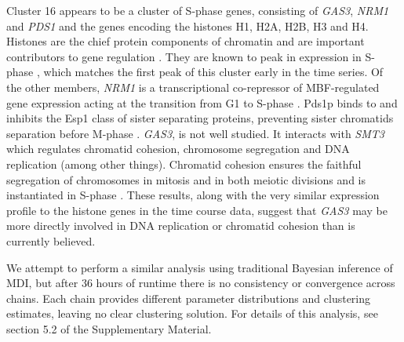 \documentclass[12pt]{article}
\begin{document}
Cluster 16 appears to be a cluster of S-phase genes, consisting of \emph{GAS3}, \emph{NRM1} and \emph{PDS1} and the genes encoding the histones H1, H2A, H2B, H3 and H4. Histones are the chief protein components of chromatin \citep{fischle2003histone} and are important contributors to gene regulation \citep{bannister2011regulation}. They are known to peak in expression in S-phase \citep{granovskaia2010high}, which matches the first peak of this cluster early in the time series. Of the other members, \emph{NRM1} is a transcriptional co-repressor of MBF-regulated gene expression acting at the transition from G1 to S-phase \citep{de2006constraining, aligianni2009fission}. Pds1p binds to and inhibits the Esp1 class of sister separating proteins, preventing sister chromatids separation before M-phase \citep{ciosk1998esp1, toth1999yeast}. \emph{GAS3}, is not well studied. It interacts with \emph{SMT3} which regulates chromatid cohesion, chromosome segregation and DNA replication (among other things). Chromatid cohesion ensures the faithful segregation of chromosomes in mitosis and in both meiotic divisions \citep{cooper2009pds1p} and is instantiated in S-phase \citep{toth1999yeast}. These results, along with the very similar expression profile to the histone genes in the time course data, suggest that \emph{GAS3} may be more directly involved in DNA replication or chromatid cohesion than is currently believed.

We attempt to perform a similar analysis using traditional Bayesian inference of MDI, but after 36 hours of runtime there is no consistency or convergence across chains. Each chain provides different parameter distributions and clustering estimates, leaving no clear clustering solution. For details of this analysis, see section 5.2 of the Supplementary Material.

\end{document}
